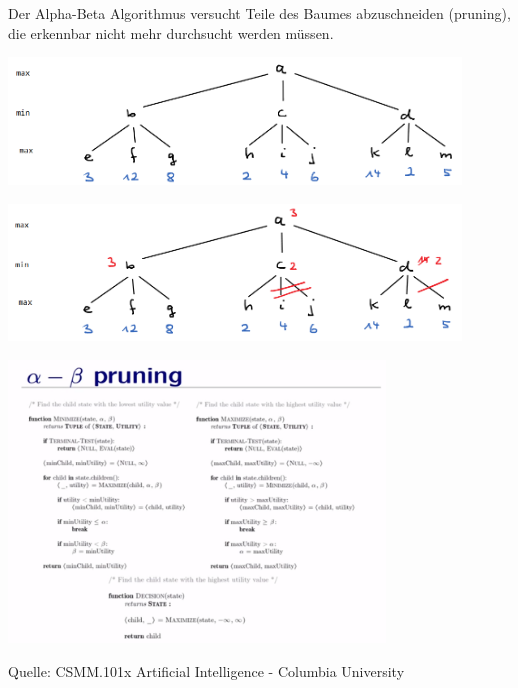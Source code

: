 \begin{frame}[fragile]
Der Alpha-Beta Algorithmus versucht Teile des Baumes abzuschneiden (pruning), die erkennbar nicht mehr durchsucht werden müssen.

\includegraphics[width=12cm]{bild12.png} 
\end{frame}

\begin{frame}[fragile]
\includegraphics[width=12cm]{bild13.png} 
\end{frame}


\begin{frame}[fragile]
\includegraphics[width=10cm]{alpha_beta.png} 

\tiny{Quelle: CSMM.101x Artificial Intelligence - Columbia University}
\end{frame}



